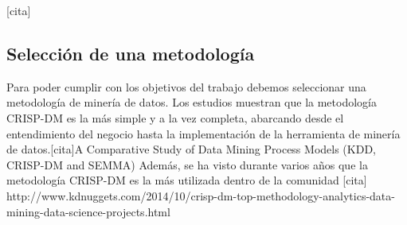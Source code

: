[cita] 

\subsection{Selección de una metodología}

Para poder cumplir con los objetivos del trabajo debemos seleccionar una metodología de minería de datos. Los estudios muestran que la metodología CRISP-DM es la más simple y a la vez completa, abarcando desde el entendimiento del negocio hasta la implementación de la herramienta de minería de datos.[cita]A Comparative Study of Data Mining Process Models (KDD, CRISP-DM and SEMMA) Además, se ha visto durante varios años que la metodología CRISP-DM es la más utilizada dentro de la comunidad [cita] http://www.kdnuggets.com/2014/10/crisp-dm-top-methodology-analytics-data-mining-data-science-projects.html

